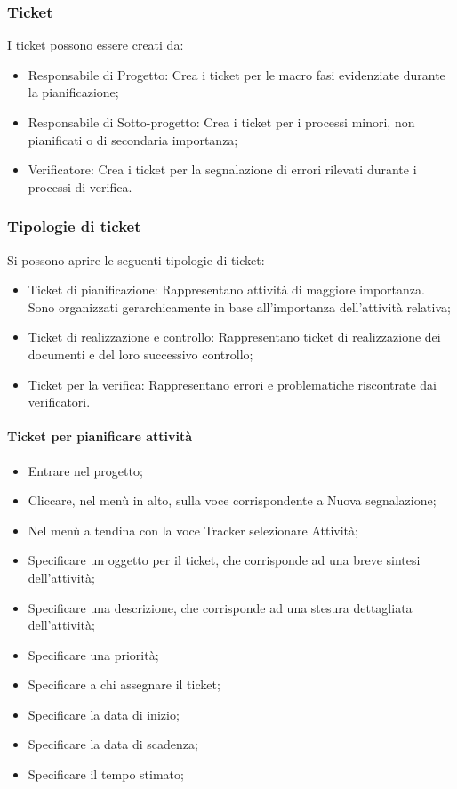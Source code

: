 \subsubsection{Ticket}
I ticket possono essere creati da:
\begin{itemize}
\item Responsabile di Progetto: Crea i ticket per le macro fasi evidenziate durante la pianificazione;
\item Responsabile di Sotto-progetto: Crea i ticket per i processi minori, non pianificati o di secondaria importanza;
\item Verificatore: Crea i ticket per la segnalazione di errori rilevati durante i processi di verifica.
\end{itemize}

\subsubsection{Tipologie di ticket}

Si possono aprire le seguenti tipologie di ticket:
\begin{itemize}
\item Ticket di pianificazione: Rappresentano attività di maggiore importanza. Sono organizzati gerarchicamente in base all'importanza dell'attività relativa;
\item Ticket di realizzazione e controllo: Rappresentano ticket di realizzazione dei documenti e del loro successivo controllo;
\item Ticket per la verifica: Rappresentano errori e problematiche riscontrate dai verificatori.

\end{itemize}

\paragraph{Ticket per pianificare attività}
\begin{itemize}
\item Entrare nel progetto;
\item Cliccare, nel menù in alto, sulla voce corrispondente a Nuova segnalazione;
\item Nel menù a tendina con la voce Tracker selezionare Attività;
\item Specificare un oggetto per il ticket, che corrisponde ad una breve sintesi dell'attività;
\item Specificare una descrizione, che corrisponde ad una stesura dettagliata dell'attività;
\item Specificare una priorità;
\item Specificare a chi assegnare il ticket;
\item Specificare la data di inizio;
\item Specificare la data di scadenza;
\item Specificare il tempo stimato;
\end{itemize}

